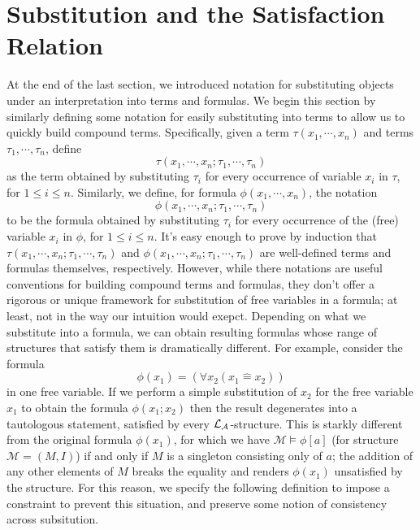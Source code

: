 \documentclass{article}
\begin{document}
\section{Substitution and the Satisfaction Relation}
At the end of the last section, we introduced notation for substituting objects under an interpretation into terms and formulas. We begin this section by similarly defining some notation for easily substituting into terms to allow us to quickly build compound terms. Specifically, given a term $ \tau(x_1, \cdots, x_n) $ and terms $ \tau_1, \cdots, \tau_n $, define
    $$ \tau(x_1, \cdots, x_n; \tau_1, \cdots, \tau_n) $$
as the term obtained by substituting $ \tau_i $ for every occurrence of variable $ x_i $ in $ \tau $, for $ 1 \leq i \leq n $. Similarly, we define, for formula $ \phi(x_1, \cdots, x_n) $, the notation
    $$ \phi(x_1, \cdots, x_n; \tau_1, \cdots, \tau_n) $$
to be the formula obtained by substituting $ \tau_i $ for every occurrence of the (free) variable $ x_i $ in $ \phi $, for $ 1 \leq i \leq n $. It's easy enough to prove by induction that $ \tau(x_1, \cdots, x_n; \tau_1, \cdots, \tau_n) $ and $ \phi(x_1, \cdots, x_n; \tau_1, \cdots, \tau_n) $ are well-defined terms and formulas themselves, respectively. However, while there notations are useful conventions for building compound terms and formulas, they don't offer a rigorous or unique framework for substitution of free variables in a formula; at least, not in the way our intuition would exepct. Depending on what we substitute into a formula, we can obtain resulting formulas whose range of structures that satisfy them is dramatically different. For example, consider the formula
    $$ \phi(x_1) = (\forall x_2 (x_1 \hat{=} x_2)) $$
in one free variable. If we perform a simple substitution of $ x_2 $ for the free variable $ x_1 $ to obtain the formula $ \phi(x_1; x_2) $ then the result degenerates into a tautologous statement, satisfied by every $ \mathcal{L}_{\mathcal{A}} $-structure. This is starkly different from the original formula $ \phi(x_1) $, for which we have $ \mathcal{M} \vDash \phi[a] $ (for structure $ \mathcal{M} = (M, I) $) if and only if $ M $ is a singleton consisting only of $ a $; the addition of any other elements of $ M $ breaks the equality and renders $ \phi(x_1) $ unsatisfied by the structure. For this reason, we specify the following definition to impose a constraint to prevent this situation, and preserve some notion of consistency across subsitution.
\end{document}
